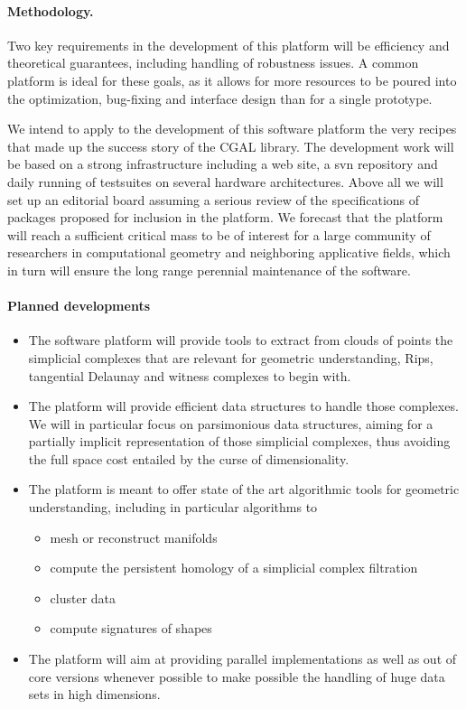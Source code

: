 

\paragraph{ Methodology.} 
Two key requirements in the development of this platform will be
efficiency and theoretical guarantees, including handling of
robustness issues. A common
platform is ideal for these goals, as it allows for more
resources to be poured into the optimization, bug-fixing and interface
design than for a single prototype.

 We intend to apply to the development of this software platform 
the very  recipes that made up the success story
of the CGAL library. 
The development work will be based on a strong infrastructure
including a web site, a svn repository and  daily running of testsuites on several  hardware architectures.
Above all we will set up  an editorial board assuming a  serious review of the 
specifications of packages proposed for inclusion in the platform.
We forecast that the platform will reach a sufficient critical mass
to be of interest for a large community of researchers in
computational geometry and neighboring applicative fields,
which in turn will ensure the long range perennial maintenance
of the software.



\paragraph{Planned developments} 
\begin{itemize}
\item The software platform will provide tools to extract from clouds of points the
simplicial complexes that are relevant for geometric understanding,
Rips, tangential Delaunay  and witness complexes to begin with. 
\item The platform will provide efficient data structures to handle those
complexes. We will in particular  focus on parsimonious data
structures, aiming for a partially implicit representation of those simplicial
complexes, thus avoiding the full space cost entailed by the curse of
dimensionality. 
\item The platform is meant to offer state of the art algorithmic tools for geometric
understanding,
including in particular algorithms to
\begin{itemize}
\item  mesh or reconstruct manifolds
\item  compute the persistent homology of a simplicial complex filtration 
\item cluster data
\item compute signatures of shapes
\end{itemize}
\item The platform will aim at providing parallel implementations as well
as out of core versions whenever possible to make possible the
handling of huge data sets in high dimensions.
\end{itemize}

